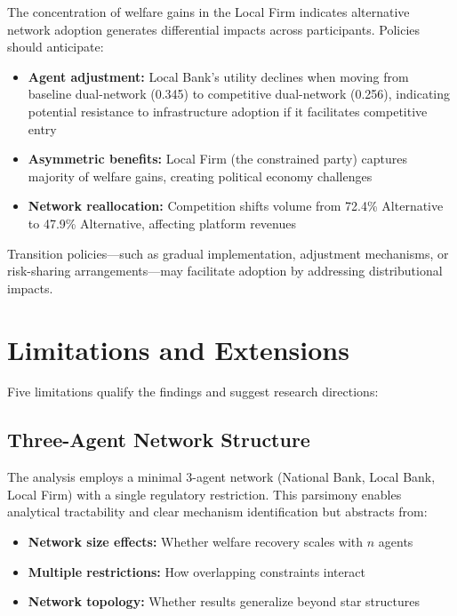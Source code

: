 The concentration of welfare gains in the Local Firm indicates alternative network adoption generates differential impacts across participants. Policies should anticipate:

\begin{itemize}
    \item \textbf{Agent adjustment:} Local Bank's utility declines when moving from baseline dual-network (0.345) to competitive dual-network (0.256), indicating potential resistance to infrastructure adoption if it facilitates competitive entry
    \item \textbf{Asymmetric benefits:} Local Firm (the constrained party) captures majority of welfare gains, creating political economy challenges
    \item \textbf{Network reallocation:} Competition shifts volume from 72.4\% Alternative to 47.9\% Alternative, affecting platform revenues
\end{itemize}

Transition policies—such as gradual implementation, adjustment mechanisms, or risk-sharing arrangements—may facilitate adoption by addressing distributional impacts.

\section{Limitations and Extensions}

Five limitations qualify the findings and suggest research directions:

\subsection{Three-Agent Network Structure}

The analysis employs a minimal 3-agent network (National Bank, Local Bank, Local Firm) with a single regulatory restriction. This parsimony enables analytical tractability and clear mechanism identification but abstracts from:

\begin{itemize}
    \item \textbf{Network size effects:} Whether welfare recovery scales with $n$ agents
    \item \textbf{Multiple restrictions:} How overlapping constraints interact
    \item \textbf{Network topology:} Whether results generalize beyond star structures
\end{itemize}

